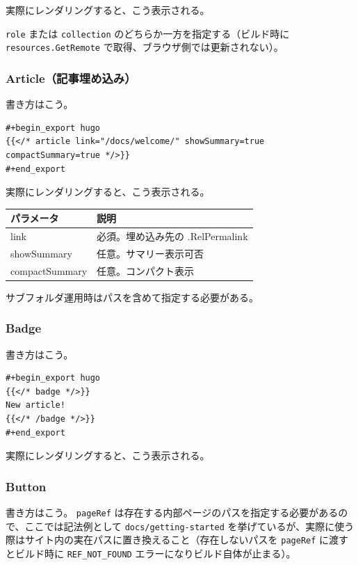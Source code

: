 \documentclass[11pt]{article}
\begin{document}
実際にレンダリングすると、こう表示される。

\texttt{role} または \texttt{collection} のどちらか一方を指定する（ビルド時に \texttt{resources.GetRemote} で取得、ブラウザ側では更新されない）。
\subsubsection{Article（記事埋め込み）}
\label{sec:orga13ad2a}

書き方はこう。

\begin{verbatim}
#+begin_export hugo
{{</* article link="/docs/welcome/" showSummary=true compactSummary=true */>}}
#+end_export
\end{verbatim}

実際にレンダリングすると、こう表示される。

\begin{center}
\begin{tabular}{ll}
パラメータ & 説明\\
\hline
link & 必須。埋め込み先の .RelPermalink\\
showSummary & 任意。サマリー表示可否\\
compactSummary & 任意。コンパクト表示\\
\end{tabular}
\end{center}

サブフォルダ運用時はパスを含めて指定する必要がある。
\subsubsection{Badge}
\label{sec:org430bb50}

書き方はこう。

\begin{verbatim}
#+begin_export hugo
{{</* badge */>}}
New article!
{{</* /badge */>}}
#+end_export
\end{verbatim}

実際にレンダリングすると、こう表示される。
\subsubsection{Button}
\label{sec:org3e095f1}

書き方はこう。 \texttt{pageRef} は存在する内部ページのパスを指定する必要があるので、ここでは記法例として \texttt{docs/getting-started} を挙げているが、実際に使う際はサイト内の実在パスに置き換えること（存在しないパスを \texttt{pageRef} に渡すとビルド時に \texttt{REF\_NOT\_FOUND} エラーになりビルド自体が止まる）。
\end{document}
